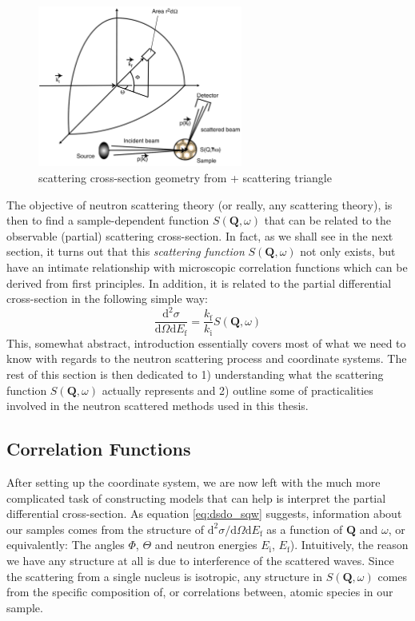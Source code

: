 \begin{figure}
	\centering
	\includegraphics[width=0.6\textwidth]{fig/method/ns/dsdo_schober.png}
	\caption[scattering cross-section geometry]{scattering cross-section geometry from \cite{Schober2014} + scattering triangle}
	\label{fig:dsdo_geometry}
\end{figure}

The objective of neutron scattering theory (or really, any scattering theory), is then to find a sample-dependent function $S(\bm{Q}, \omega)$ that can be related to the observable (partial) scattering cross-section. In fact, as we shall see in the next section, it turns out that this \emph{scattering function} $S(\bm{Q}, \omega)$ not only exists, but have an intimate relationship with microscopic correlation functions which can be derived from first principles. In addition, it is related to the partial differential cross-section in the following simple way:
%
\begin{equation}\label{eq:dsdo_sqw}
\frac{\mathrm{d}^2 \sigma}{\mathrm{d}\Omega \mathrm{d}E_\text{f}} = \frac{k_\text{f}}{k_\text{i}} S(\bm{Q}, \omega)
\end{equation}
%
This, somewhat abstract, introduction essentially covers most of what we need to know with regards to the neutron scattering process and coordinate systems. The rest of this section is then dedicated to 1) understanding what the scattering function $S(\bm{Q}, \omega)$ actually represents and 2) outline some of practicalities involved in the neutron scattered methods used in this thesis. 

\subsection{Correlation Functions}
After setting up the coordinate system, we are now left with the much more complicated task of constructing models that can help is interpret the partial differential cross-section. As equation \eqref{eq:dsdo_sqw} suggests, information about our samples comes from the structure of $\mathrm{d}^2 \sigma / \mathrm{d}\Omega \mathrm{d}E_\text{f}$ as a function of $\bm{Q}$ and $\omega$, or equivalently: The angles $\Phi$, $\Theta$ and neutron energies $E_\text{i}$, $E_\text{f}$). Intuitively, the reason we have any structure at all is due to interference of the scattered waves. Since the scattering from a single nucleus is isotropic, any structure in $S(\bm{Q}, \omega)$ comes from the specific composition of, or correlations between, atomic species in our sample. 

